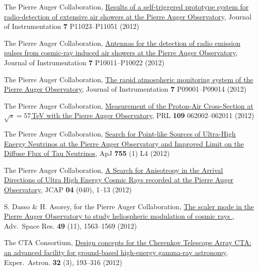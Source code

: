 \begin{etaremune}
\item {}The Pierre Auger Collaboration,
\href{http://dx.doi.org/10.1088/1748-0221/7/11/P11023}{{Results of a
self-triggered prototype system for radio-detection of extensive air showers at
the Pierre Auger Observatory}}, Journal of Instrumentation {\textbf{7}} P11023--P11051 (2012)

\item {}The Pierre Auger Collaboration,
\href{http://dx.doi.org/10.1088/1748-0221/7/10/P10011}{{Antennas for the
detection of radio emission pulses from cosmic-ray induced air showers at the
Pierre Auger Observatory}}, Journal of Instrumentation {\textbf{7}} P10011--P10022 (2012)

\item {}The Pierre Auger Collaboration,
\href{http://dx.doi.org/10.1088/1748-0221/7/09/P09001}{{The rapid
atmospheric monitoring system of the Pierre Auger Observatory}}, Journal of Instrumentation
{\textbf{7}} P09001--P09014 (2012)

\item {}The Pierre Auger Collaboration,
\href{http://dx.doi.org/10.1103/PhysRevLett.109.062002}{{Measurement of
the Proton-Air Cross-Section at $\sqrt{s}=57$\,TeV with the Pierre Auger
Observatory}}, PRL {\textbf{109}} 062002--062011 (2012)

\item {}The Pierre Auger Collaboration,
\href{http://dx.doi.org/10.1088/2041-8205/755/1/L4}{{Search for Point-like
Sources of Ultra-High Energy Neutrinos at the Pierre Auger Observatory and
Improved Limit on the Diffuse Flux of Tau Neutrinos}}, ApJ {\textbf{755}} (1) L4
(2012)

\item {}The Pierre Auger Collaboration, 
\href{http://dx.doi.org/10.1088/1475-7516/2012/04/040}{{A Search for
Anisotropy in the Arrival Directions of Ultra High Energy Cosmic Rays recorded
at the Pierre Auger Observatory}}, JCAP {\textbf{04}} (040), 1--13 (2012)

\item {}S. Dasso \& H. Asorey, for the Pierre Auger Collaboration,
\href{http://dx.doi.org/10.1016/j.asr.2011.12.028}{{ The scaler mode in
the Pierre Auger Observatory to study heliospheric modulation of cosmic rays
}}, Adv.\ Space Res. {\textbf{49}} (11), 1563--1569 (2012)

\item {}The CTA Consortium,
\href{http://dx.doi.org/10.1007/s10686-011-9247-0}{{Design concepts for
the Cherenkov Telescope Array CTA: an advanced facility for ground-based
high-energy gamma-ray astronomy}}, Exper.\ Astron. {\textbf{32}} (3), 193--316
(2012)


\end{etaremune}
